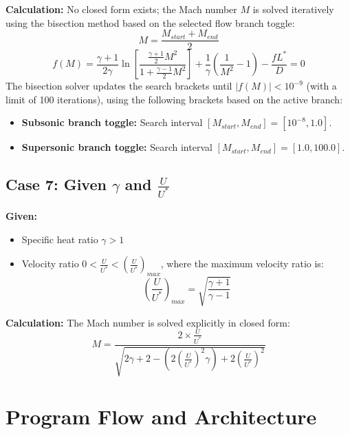 \textbf{Calculation:} No closed form exists; the Mach number $M$ is solved iteratively using the bisection method based on the selected flow branch toggle:
\begin{equation}
M = \frac{M_{start}+M_{end}}{2}
\end{equation}
\begin{equation}
f(M) = \frac{\gamma+1}{2\gamma}\ln\left[\frac{\frac{\gamma+1}{2}M^2}{1+\frac{\gamma-1}{2}M^2}\right] + \frac{1}{\gamma}\left(\frac{1}{M^2}-1\right) - \frac{f L^*}{D} = 0
\end{equation}
The bisection solver updates the search brackets until $|f(M)| < 10^{-9}$ (with a limit of 100 iterations), using the following brackets based on the active branch:
\begin{itemize}[nosep]
    \item \textbf{Subsonic branch toggle:} Search interval $[M_{start}, M_{end}] = [10^{-8}, 1.0]$.
    \item \textbf{Supersonic branch toggle:} Search interval $[M_{start}, M_{end}] = [1.0, 100.0]$.
\end{itemize}


\subsection*{Case 7: Given $\gamma$ and $\frac{U}{U^*}$}

\textbf{Given:}
\begin{itemize}[nosep]
    \item Specific heat ratio $\gamma > 1$
    \item Velocity ratio $0 < \frac{U}{U^*} < \left(\frac{U}{U^*}\right)_{max}$, where the maximum velocity ratio is:
    \begin{equation}
    \left(\frac{U}{U^*}\right)_{max} = \sqrt{\frac{\gamma+1}{\gamma-1}}
    \end{equation}
\end{itemize}

\textbf{Calculation:} The Mach number is solved explicitly in closed form:
\begin{equation}
M = \frac{2\times\frac{U}{U^*}}{\sqrt{2\gamma+2-\left(2\left(\frac{U}{U^*}\right)^2\gamma\right)+2\left(\frac{U}{U^*}\right)^2}}
\end{equation}



\section{Program Flow and Architecture}

